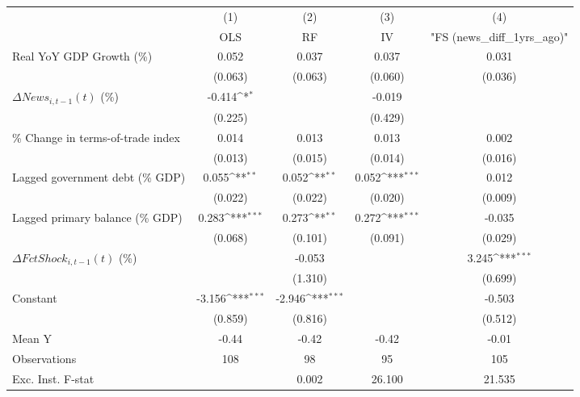 {
\def\sym#1{\ifmmode^{#1}\else\(^{#1}\)\fi}
\begin{tabular}{l*{4}{c}}
\toprule
                    &\multicolumn{1}{c}{(1)}&\multicolumn{1}{c}{(2)}&\multicolumn{1}{c}{(3)}&\multicolumn{1}{c}{(4)}\\
                    &\multicolumn{1}{c}{OLS}&\multicolumn{1}{c}{RF}&\multicolumn{1}{c}{IV}&\multicolumn{1}{c}{ "FS (news_diff_1yrs_ago)" }\\
\midrule
Real YoY GDP Growth (\%)&       0.052         &       0.037         &       0.037         &       0.031         \\
                    &     (0.063)         &     (0.063)         &     (0.060)         &     (0.036)         \\
\addlinespace
$ \Delta News_{i,t-1}(t)$ (\%)&      -0.414\sym{*}  &                     &      -0.019         &                     \\
                    &     (0.225)         &                     &     (0.429)         &                     \\
\addlinespace
\% Change in terms-of-trade index&       0.014         &       0.013         &       0.013         &       0.002         \\
                    &     (0.013)         &     (0.015)         &     (0.014)         &     (0.016)         \\
\addlinespace
Lagged government debt (\% GDP)&       0.055\sym{**} &       0.052\sym{**} &       0.052\sym{***}&       0.012         \\
                    &     (0.022)         &     (0.022)         &     (0.020)         &     (0.009)         \\
\addlinespace
Lagged primary balance (\% GDP)&       0.283\sym{***}&       0.273\sym{**} &       0.272\sym{***}&      -0.035         \\
                    &     (0.068)         &     (0.101)         &     (0.091)         &     (0.029)         \\
\addlinespace
$ \Delta FctShock_{i,t-1}(t)$ (\%)&                     &      -0.053         &                     &       3.245\sym{***}\\
                    &                     &     (1.310)         &                     &     (0.699)         \\
\addlinespace
Constant            &      -3.156\sym{***}&      -2.946\sym{***}&                     &      -0.503         \\
                    &     (0.859)         &     (0.816)         &                     &     (0.512)         \\
\midrule
Mean Y              &       -0.44         &       -0.42         &       -0.42         &       -0.01         \\
Observations        &         108         &          98         &          95         &         105         \\
Exc. Inst. F-stat   &                     &       0.002         &      26.100         &      21.535         \\
\bottomrule
\end{tabular}
}
